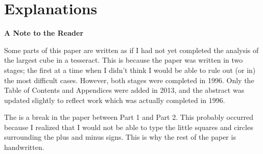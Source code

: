 \section{Explanations}
\begin{center}
{\bf A Note to the Reader}
\end{center}
\vspace{-0.2in}
Some parts of this paper are written as if I had not yet completed the
analysis of the largest cube in a tesseract.  This is because the paper was
written in two stages; the first at a time when I didn't think I would be able
to rule out (or in) the most difficult cases.  However, both stages were
completed in 1996.  Only the Table of Contents and Appendices were added in
2013, and the abstract was updated slightly to reflect work which was actually
completed in 1996.

The is a break in the paper between Part 1 and Part 2.  This probably occurred
because I realized that I would not be able to type the little squares and
circles surrounding the plus and minus signs.  This is why the rest of the
paper is handwritten.
\newpage

\renewcommand\thetheorem{\thesection.\arabic{theorem}}
\setcounter{theorem}{0}

